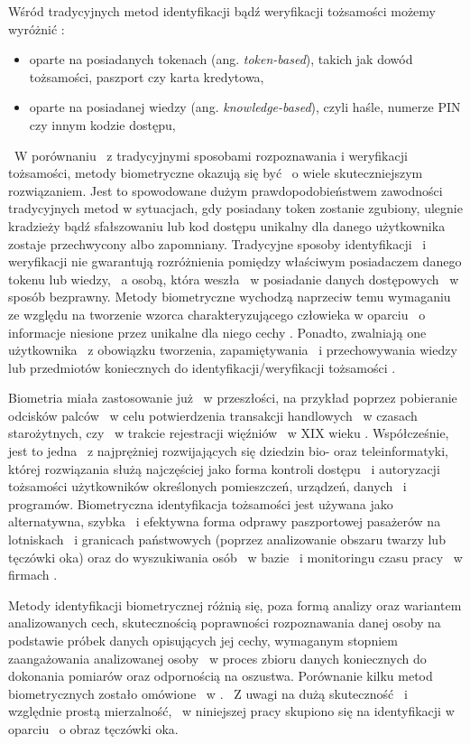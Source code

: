 Wśród tradycyjnych metod identyfikacji bądź weryfikacji tożsamości możemy wyróżnić \cite{Jain00}\cite{Jain08}:
\begin{itemize}
\item oparte na posiadanych tokenach (ang. \emph{token-based}), takich jak dowód tożsamości, paszport czy karta kredytowa,
\item oparte na posiadanej wiedzy (ang. \emph{knowledge-based}), czyli haśle, numerze PIN czy innym kodzie dostępu,
\end{itemize}
~W porównaniu ~z tradycyjnymi sposobami rozpoznawania i weryfikacji tożsamości, metody biometryczne okazują się być ~o wiele skuteczniejszym rozwiązaniem. Jest to spowodowane dużym prawdopodobieństwem zawodności tradycyjnych metod w sytuacjach, gdy posiadany token zostanie zgubiony, ulegnie kradzieży bądź sfałszowaniu lub kod dostępu unikalny dla danego użytkownika zostaje przechwycony albo zapomniany. Tradycyjne sposoby identyfikacji ~i weryfikacji nie gwarantują rozróżnienia pomiędzy właściwym posiadaczem danego tokenu lub wiedzy, ~a osobą, która weszła ~w posiadanie danych dostępowych ~w sposób bezprawny. Metody biometryczne wychodzą naprzeciw temu wymaganiu ze względu na tworzenie wzorca charakteryzującego człowieka w oparciu ~o informacje niesione przez unikalne dla niego cechy \cite{Jain00}. Ponadto, zwalniają one użytkownika ~z obowiązku tworzenia, zapamiętywania ~i przechowywania wiedzy lub przedmiotów koniecznych do identyfikacji/weryfikacji tożsamości \cite{Jain08}.  

Biometria miała zastosowanie już ~w przeszłości, na przykład poprzez pobieranie odcisków palców ~w celu potwierdzenia transakcji handlowych ~w czasach starożytnych, czy ~w trakcie rejestracji więźniów ~w XIX wieku \cite{Bio02}\cite{HF1}. Współcześnie, jest to jedna ~z najprężniej rozwijających się dziedzin bio- oraz teleinformatyki, której rozwiązania służą najczęściej jako forma kontroli dostępu ~i autoryzacji tożsamości użytkowników określonych pomieszczeń, urządzeń, danych ~i programów. Biometryczna identyfikacja tożsamości jest używana jako alternatywna, szybka ~i efektywna forma odprawy paszportowej pasażerów na lotniskach ~i granicach państwowych (poprzez analizowanie obszaru twarzy lub tęczówki oka) oraz do wyszukiwania osób ~w bazie ~i monitoringu czasu pracy ~w firmach \cite{Bio01}\cite{Bio02}.

Metody identyfikacji biometrycznej różnią się, poza formą analizy oraz wariantem analizowanych cech, skutecznością poprawności rozpoznawania danej osoby na podstawie próbek danych opisujących jej cechy, wymaganym stopniem zaangażowania analizowanej osoby ~w proces zbioru danych koniecznych do dokonania pomiarów oraz odpornością na oszustwa. Porównanie kilku metod biometrycznych zostało omówione ~w \cite{Gl11}. ~Z uwagi na dużą skuteczność ~i względnie prostą mierzalność, ~w niniejszej pracy skupiono się na identyfikacji w oparciu ~o obraz tęczówki oka.


